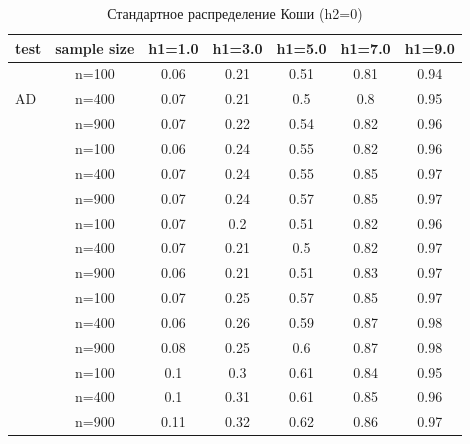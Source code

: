 \documentclass[12pt]{article}
\theoremstyle{break}
\begin{document}
\begin{table}[!h]
	\centering
	\caption{Стандартное распределение Коши (h2=0)}
	\begin{tabular}{l c c c c c c} 
		\toprule
		test & sample size & h1=1.0 & h1=3.0 & h1=5.0 & h1=7.0 & h1=9.0 \\ 
		\midrule
		\multirow{3}{*}{AD} 
		& n=100 & 0.06 & 0.21 & 0.51 & 0.81 & 0.94 \\ 
		& n=400 & 0.07 & 0.21 & 0.5 & 0.8 & 0.95 \\ 
		& n=900 & 0.07 & 0.22 & 0.54 & 0.82 & 0.96 \\ 
		\addlinespace
		\addlinespace
		\multirow{3}{*}{CM} 
		& n=100 & 0.06 & 0.24 & 0.55 & 0.82 & 0.96 \\ 
		& n=400 & 0.07 & 0.24 & 0.55 & 0.85 & 0.97 \\ 
		& n=900 & 0.07 & 0.24 & 0.57 & 0.85 & 0.97 \\ 
		\addlinespace
		\addlinespace
		\multirow{3}{*}{ET} 
		& n=100 & 0.07 & 0.2 & 0.51 & 0.82 & 0.96 \\ 
		& n=400 & 0.07 & 0.21 & 0.5 & 0.82 & 0.97 \\ 
		& n=900 & 0.06 & 0.21 & 0.51 & 0.83 & 0.97 \\ 
		\addlinespace
		\addlinespace
		\multirow{3}{*}{KS} 
		& n=100 & 0.07 & 0.25 & 0.57 & 0.85 & 0.97 \\ 
		& n=400 & 0.06 & 0.26 & 0.59 & 0.87 & 0.98 \\ 
		& n=900 & 0.08 & 0.25 & 0.6 & 0.87 & 0.98 \\ 
		\addlinespace
		\addlinespace
		\multirow{3}{*}{WMW} 
		& n=100 & 0.1 & 0.3 & 0.61 & 0.84 & 0.95 \\ 
		& n=400 & 0.1 & 0.31 & 0.61 & 0.85 & 0.96 \\ 
		& n=900 & 0.11 & 0.32 & 0.62 & 0.86 & 0.97 \\ 
		\bottomrule
	\end{tabular}
	\label{tbl:cauchy_pow_vs_h1}
\end{table}
\end{document}

